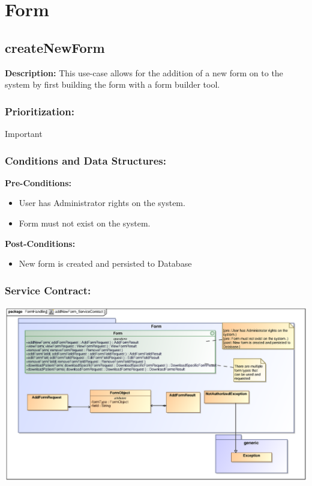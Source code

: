 

\section{Form}



\subsection{createNewForm}
\textbf{Description:}
This use-case allows for the addition of a new form on to the system by first building the form with a form builder tool.
\subsubsection{Prioritization:}
Important
\subsubsection{Conditions and Data Structures:}
\textbf{Pre-Conditions:}
\begin{itemize}
	\item User has Administrator rights on the system.
	\item Form must not exist on the system.
\end{itemize}

\textbf{Post-Conditions:}	
\begin{itemize}
	\item New form is created and persisted to Database
\end{itemize}
\subsubsection{Service Contract:} 
\includegraphics[width=1\linewidth]{./Graphics/FormUseCaseDiagrams/addNewForm_ServiceContract}
